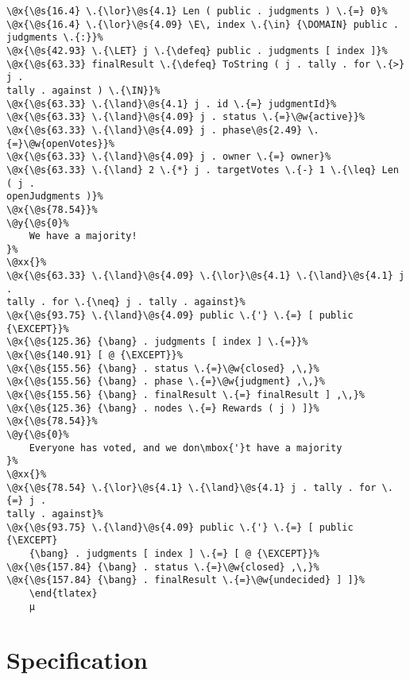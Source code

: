 \begin{lstlisting}[caption=TLA\textsuperscript+ model of chaincode, label=lst:ChaincodeModel]
\@x{\@s{16.4} \.{\lor}\@s{4.1} Len ( public . judgments ) \.{=} 0}%
\@x{\@s{16.4} \.{\lor}\@s{4.09} \E\, index \.{\in} {\DOMAIN} public .
judgments \.{:}}%
\@x{\@s{42.93} \.{\LET} j \.{\defeq} public . judgments [ index ]}%
\@x{\@s{63.33} finalResult \.{\defeq} ToString ( j . tally . for \.{>} j .
tally . against ) \.{\IN}}%
\@x{\@s{63.33} \.{\land}\@s{4.1} j . id \.{=} judgmentId}%
\@x{\@s{63.33} \.{\land}\@s{4.09} j . status \.{=}\@w{active}}%
\@x{\@s{63.33} \.{\land}\@s{4.09} j . phase\@s{2.49} \.{=}\@w{openVotes}}%
\@x{\@s{63.33} \.{\land}\@s{4.09} j . owner \.{=} owner}%
\@x{\@s{63.33} \.{\land} 2 \.{*} j . targetVotes \.{-} 1 \.{\leq} Len ( j .
openJudgments )}%
\@x{\@s{78.54}}%
\@y{\@s{0}%
    We have a majority!
}%
\@xx{}%
\@x{\@s{63.33} \.{\land}\@s{4.09} \.{\lor}\@s{4.1} \.{\land}\@s{4.1} j .
tally . for \.{\neq} j . tally . against}%
\@x{\@s{93.75} \.{\land}\@s{4.09} public \.{'} \.{=} [ public {\EXCEPT}}%
\@x{\@s{125.36} {\bang} . judgments [ index ] \.{=}}%
\@x{\@s{140.91} [ @ {\EXCEPT}}%
\@x{\@s{155.56} {\bang} . status \.{=}\@w{closed} ,\,}%
\@x{\@s{155.56} {\bang} . phase \.{=}\@w{judgment} ,\,}%
\@x{\@s{155.56} {\bang} . finalResult \.{=} finalResult ] ,\,}%
\@x{\@s{125.36} {\bang} . nodes \.{=} Rewards ( j ) ]}%
\@x{\@s{78.54}}%
\@y{\@s{0}%
    Everyone has voted, and we don\mbox{'}t have a majority
}%
\@xx{}%
\@x{\@s{78.54} \.{\lor}\@s{4.1} \.{\land}\@s{4.1} j . tally . for \.{=} j .
tally . against}%
\@x{\@s{93.75} \.{\land}\@s{4.09} public \.{'} \.{=} [ public {\EXCEPT}
    {\bang} . judgments [ index ] \.{=} [ @ {\EXCEPT}}%
\@x{\@s{157.84} {\bang} . status \.{=}\@w{closed} ,\,}%
\@x{\@s{157.84} {\bang} . finalResult \.{=}\@w{undecided} ] ]}%
	\end{tlatex}
	µ
\end{lstlisting}

\section{Specification}
\label{subsec:ModelSpec}

